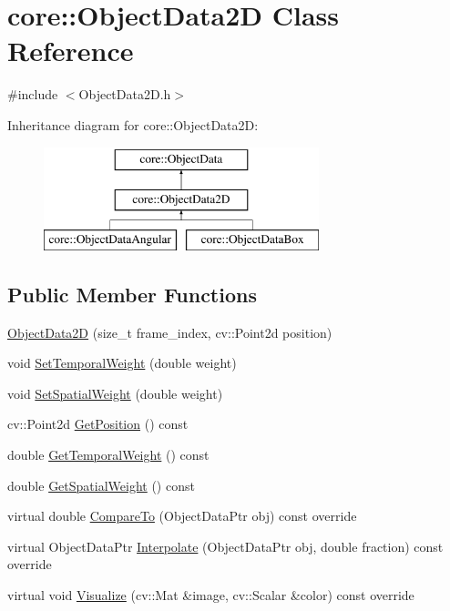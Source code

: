 \hypertarget{classcore_1_1ObjectData2D}{}\section{core\+:\+:Object\+Data2D Class Reference}
\label{classcore_1_1ObjectData2D}


{\ttfamily \#include $<$Object\+Data2\+D.\+h$>$}

Inheritance diagram for core\+:\+:Object\+Data2D\+:\begin{figure}[H]
\begin{center}
\leavevmode
\includegraphics[height=3.000000cm]{classcore_1_1ObjectData2D}
\end{center}
\end{figure}
\subsection*{Public Member Functions}
\begin{DoxyCompactItemize}
\item 
\hyperlink{classcore_1_1ObjectData2D_adc35e5b8597ea47ad3568259c2e800c6}{Object\+Data2D} (size\+\_\+t frame\+\_\+index, cv\+::\+Point2d position)
\item 
void \hyperlink{classcore_1_1ObjectData2D_a2850785393bc7a5250427bbda84c1b58}{Set\+Temporal\+Weight} (double weight)
\item 
void \hyperlink{classcore_1_1ObjectData2D_ad62bf8b2362e8f3547f8040a144fa346}{Set\+Spatial\+Weight} (double weight)
\item 
cv\+::\+Point2d \hyperlink{classcore_1_1ObjectData2D_ab3c0694ec38f2d59a4092f46f876498b}{Get\+Position} () const
\item 
double \hyperlink{classcore_1_1ObjectData2D_a35381efb292d20f2b181558c129269f3}{Get\+Temporal\+Weight} () const
\item 
double \hyperlink{classcore_1_1ObjectData2D_a688087ccdd999d7e16f5c68cc460209d}{Get\+Spatial\+Weight} () const
\item 
virtual double \hyperlink{classcore_1_1ObjectData2D_a68d56bd5f26a41830a87ae32eabf9126}{Compare\+To} (Object\+Data\+Ptr obj) const override
\item 
virtual Object\+Data\+Ptr \hyperlink{classcore_1_1ObjectData2D_a59b974e09f74f0a2640e3152893fe79f}{Interpolate} (Object\+Data\+Ptr obj, double fraction) const override
\item 
virtual void \hyperlink{classcore_1_1ObjectData2D_aff4e8539559f4ce50a7f43b733d6c512}{Visualize} (cv\+::\+Mat \&image, cv\+::\+Scalar \&color) const override
\end{DoxyCompactItemize}


